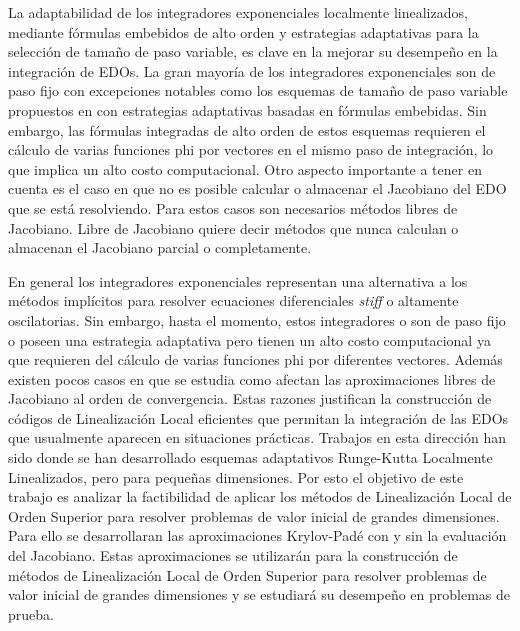 La adaptabilidad de los integradores exponenciales localmente linealizados, mediante fórmulas embebidos de alto orden y estrategias adaptativas para la selección de tamaño de paso variable, es clave en la mejorar su desempeño en la integración de EDOs. La gran mayoría de los integradores exponenciales son de paso fijo con excepciones notables como los esquemas de tamaño de paso variable propuestos en \cite{hochbruck1998exponential,caliari2009implementation,tokman2012new,luan2014exponential} con estrategias adaptativas basadas en fórmulas embebidas. Sin embargo, las fórmulas integradas de alto orden de estos esquemas requieren el cálculo de varias funciones phi por vectores en el mismo paso de integración, lo que implica un alto costo computacional. Otro aspecto importante a tener en cuenta es el caso en que no es posible calcular o almacenar el Jacobiano del EDO que se está resolviendo. Para estos casos son necesarios métodos libres de Jacobiano. Libre de Jacobiano quiere decir métodos que nunca calculan o almacenan el Jacobiano parcial o completamente.

En general los integradores exponenciales representan una alternativa a los métodos implícitos para resolver ecuaciones diferenciales \emph{stiff} o altamente oscilatorias. Sin embargo, hasta el momento, estos integradores o son de paso fijo o poseen una estrategia adaptativa pero tienen un alto costo computacional ya que requieren del cálculo de varias funciones phi por diferentes vectores. Además existen pocos casos en que se estudia como afectan las aproximaciones libres de Jacobiano al orden de convergencia. Estas razones justifican la construcción de códigos de Linealización Local eficientes que permitan la integración de las EDOs que usualmente aparecen en situaciones prácticas. Trabajos en esta dirección han sido \cite{Jimenez13,Jimenez14AMC} donde se han desarrollado esquemas adaptativos Runge-Kutta Localmente Linealizados, pero para pequeñas dimensiones. Por esto el objetivo de este trabajo es analizar la factibilidad de aplicar los métodos de Linealización Local de Orden Superior para resolver problemas de valor inicial de grandes dimensiones. Para ello se desarrollaran las aproximaciones Krylov-Padé con y sin la evaluación del Jacobiano. Estas aproximaciones se utilizarán para la construcción de métodos de Linealización Local de Orden Superior para resolver problemas de valor inicial de grandes dimensiones y se estudiará su desempeño en problemas de prueba.

